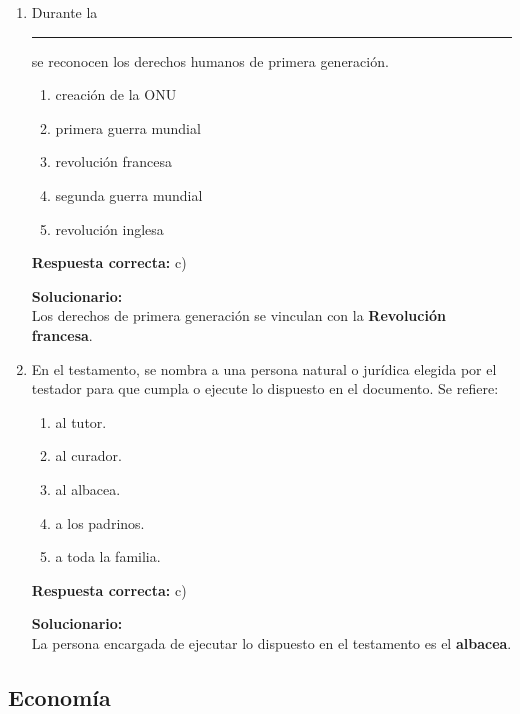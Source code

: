 \begin{enumerate}
	
	\item Durante la \rule{2cm}{0.4pt} se reconocen los derechos humanos de primera generación.
	\begin{enumerate}[label=\alph*)]
		\item creación de la ONU
		\item primera guerra mundial
		\item revolución francesa
		\item segunda guerra mundial
		\item revolución inglesa
	\end{enumerate}
	\textbf{Respuesta correcta:} c)
	
	\vspace{2mm}
	\textbf{Solucionario:}\\
	Los derechos de primera generación se vinculan con la \textbf{Revolución francesa}.
	
	\vspace{6mm}
	
	\item En el testamento, se nombra a una persona natural o jurídica elegida por el testador para que cumpla o ejecute lo dispuesto en el documento. Se refiere:
	\begin{enumerate}[label=\alph*)]
		\item al tutor.
		\item al curador.
		\item al albacea.
		\item a los padrinos.
		\item a toda la familia.
	\end{enumerate}
	\textbf{Respuesta correcta:} c)
	
	\vspace{2mm}
	\textbf{Solucionario:}\\
	La persona encargada de ejecutar lo dispuesto en el testamento es el \textbf{albacea}.
	
	\vspace{6mm}
	
\end{enumerate}

\subsection*{Economía}

